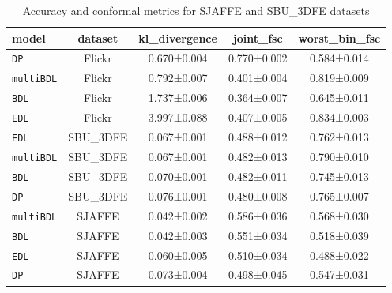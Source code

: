 \begin{table}[h]
\centering
\caption{Accuracy and conformal metrics for SJAFFE and SBU\_3DFE datasets}
\label{tab:sjaffe_sbu_accuracy}

\begin{tabular}{lcccc}
\toprule
\textbf{model} & \textbf{dataset} & \textbf{kl\_divergence} & \textbf{joint\_fsc} & \textbf{worst\_bin\_fsc} \\
\midrule
\texttt{DP} & Flickr & 0.670±0.004 & 0.770±0.002 & 0.584±0.014 \\
\texttt{multiBDL} & Flickr & 0.792±0.007 & 0.401±0.004 & 0.819±0.009 \\
\texttt{BDL} & Flickr & 1.737±0.006 & 0.364±0.007 & 0.645±0.011 \\
\texttt{EDL} & Flickr & 3.997±0.088 & 0.407±0.005 & 0.834±0.003 \\
\texttt{EDL} & SBU\_3DFE & 0.067±0.001 & 0.488±0.012 & 0.762±0.013 \\
\texttt{multiBDL} & SBU\_3DFE & 0.067±0.001 & 0.482±0.013 & 0.790±0.010 \\
\texttt{BDL} & SBU\_3DFE & 0.070±0.001 & 0.482±0.011 & 0.745±0.013 \\
\texttt{DP} & SBU\_3DFE & 0.076±0.001 & 0.480±0.008 & 0.765±0.007 \\
\texttt{multiBDL} & SJAFFE & 0.042±0.002 & 0.586±0.036 & 0.568±0.030 \\
\texttt{BDL} & SJAFFE & 0.042±0.003 & 0.551±0.034 & 0.518±0.039 \\
\texttt{EDL} & SJAFFE & 0.060±0.005 & 0.510±0.034 & 0.488±0.022 \\
\texttt{DP} & SJAFFE & 0.073±0.004 & 0.498±0.045 & 0.547±0.031 \\
\bottomrule
\end{tabular}

\end{table}